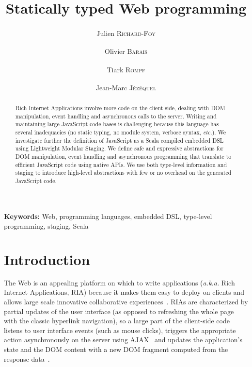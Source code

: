 \documentclass[american,english,runningheads]{llncs}
\newcommand{\etal}{\emph{et al.~}}
\newcommand{\etc}{\emph{etc.}}
\newcommand{\aka}{\emph{a.k.a.}}
\newcommand{\noun}[1]{\textsc{#1}}
\begin{document}
\setcounter{lstlisting}{0}
\renewcommand{\thelstlisting}{\arabic{lstlisting}}

\title{Statically typed Web programming}

\author{Julien \noun{Richard-Foy}\textsuperscript{\textasteriskcentered} \and Olivier \noun{Barais}\textsuperscript{\textasteriskcentered} \and
Tiark \noun{Rompf}\textsuperscript{\textdagger} \and Jean-Marc \noun{Jézéquel}\textsuperscript{\textasteriskcentered}}

\authorrunning{Julien \noun{Richard-Foy} \etal{}}

\maketitle


\begin{abstract}
Rich Internet Applications involve more code on the client-side, dealing with DOM manipulation, event handling and
asynchronous calls to the server. Writing and maintaining large JavaScript code bases is challenging because this
language has several inadequacies (no static typing, no module system, verbose syntax, \etc{}). We investigate
further the definition of JavaScript as a Scala compiled embedded DSL using Lightweight Modular Staging. We define
safe and expressive abstractions for DOM manipulation, event handling and asynchronous programming that translate to
efficient JavaScript code using native APIs. We use both type-level information and staging to introduce high-level
abstractions with few or no overhead on the generated JavaScript code.
\end{abstract}

{\bf Keywords:} Web, programming languages, embedded DSL, type-level programming, staging, Scala

\section{Introduction}

The Web is an appealing platform on which to write applications (\aka{} Rich Internet Applications, RIA) because it
makes them easy to deploy on clients and allows large scale innovative collaborative
experiences~\cite{Farrell07_RIA,Mikkonen08_SpaghettiJs}. RIAs are characterized by partial updates of the user
interface (as opposed to refreshing the whole page with the classic hyperlink navigation), so a large part of the
client-side code listens to user interface events (such as mouse clicks), triggers the appropriate action
asynchronously on the server using AJAX~\cite{Garrett05_Ajax} and updates the application’s state and the DOM content
with a new DOM fragment computed from the response data~\cite{Farrell07_RIA,Busch09_StateOfArtRIA}.
\end{document}
